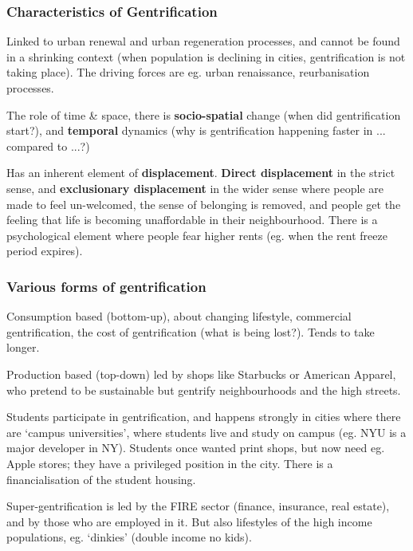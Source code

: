 \documentclass{article}
\begin{document}
\subsubsection{Characteristics of Gentrification}

Linked to urban renewal and urban regeneration processes, and cannot be found in a shrinking context (when population is declining in cities, gentrification is not taking place). The driving forces are eg. urban renaissance, reurbanisation processes.

The role of time \& space, there is \textbf{socio-spatial} change (when did gentrification start?), and \textbf{temporal} dynamics (why is gentrification happening faster in ... compared to ...?)

Has an inherent element of \textbf{displacement}. \textbf{Direct displacement} in the strict sense, and \textbf{exclusionary displacement} in the wider sense where people are made to feel un-welcomed, the sense of belonging is removed, and people get the feeling that life is becoming unaffordable in their neighbourhood. There is a psychological element where people fear higher rents (eg. when the rent freeze period expires).

\subsubsection{Various forms of gentrification}

Consumption based (bottom-up), about changing lifestyle, commercial gentrification, the cost of gentrification (what is being lost?). Tends to take longer.

Production based (top-down) led by shops like Starbucks or American Apparel, who pretend to be sustainable but gentrify neighbourhoods and the high streets.

Students participate in gentrification, and happens strongly in cities where there are `campus universities', where students live and study on campus (eg. NYU is a major developer in NY). Students once wanted print shops, but now need eg. Apple stores; they have a privileged position in the city. There is a financialisation of the student housing. 

Super-gentrification is led by the FIRE sector (finance, insurance, real estate), and by those who are employed in it. But also lifestyles of the high income populations, eg. `dinkies' (double income no kids).

\end{document}
